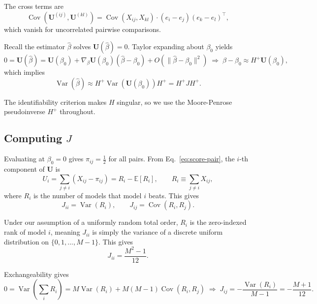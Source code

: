 \documentclass{article}
\DeclareMathOperator{\Var}{Var}
\DeclareMathOperator{\Cov}{Cov}
\begin{document}
The cross terms are 
\begin{equation}
  \Cov\!\left(\mathbf{U}^{(ij)}, \mathbf{U}^{(kl)}\right)
  = \Cov(X_{ij}, X_{kl}) \cdot (e_i - e_j)(e_k - e_l)^\top,
\end{equation}
which vanish for uncorrelated pairwise comparisons.

Recall the estimator $\hat{\beta}$ solves $\mathbf{U}(\hat\beta) = 0$. Taylor expanding about $\beta_0$ yields
\begin{equation}
  0 = \mathbf{U}(\hat\beta)
    = \mathbf{U}(\beta_0) + \nabla_\beta \mathbf{U}(\beta_0)(\hat\beta - \beta_0)
      + O\!\left(\|\hat\beta - \beta_0\|^2\right)
  \;\Longrightarrow\;
  \hat\beta - \beta_0 \approx H^{+}\mathbf{U}(\beta_0),
\end{equation}
which implies
\begin{equation}
  \Var(\hat\beta) \approx H^{+} \Var(\mathbf{U}(\beta_0)) H^{+} = H^{+} J H^{+}.
  \label{eq:sandwich}
\end{equation}

The identifiability criterion makes $H$ singular, so we use the Moore-Penrose pseudoinverse $H^+$ throughout.

\subsection{Computing \texorpdfstring{$J$}{J}}
Evaluating at $\beta_0 = 0$ gives $\pi_{ij} = \frac{1}{2}$ for all pairs. From Eq.~\ref{eq:score-pair}, the $i$-th component of $\mathbf{U}$ is
\begin{equation}
  U_i = \sum_{j \neq i}(X_{ij} - \pi_{ij}) = R_i - \mathbb{E}[R_i],
  \qquad R_i \equiv \sum_{j\neq i} X_{ij},
\end{equation}
where $R_i$ is the number of models that model $i$ beats. This gives 
\begin{equation}
    J_{ii} = \Var(R_i), \qquad J_{ij} = \Cov(R_i, R_j).
\end{equation}

Under our assumption of a uniformly random total order, $R_i$ is the zero-indexed rank of model $i$, meaning $J_{ii}$ is simply the variance of a discrete uniform distribution on $\{0, 1, ..., M-1\}$. This gives
\begin{equation}
    J_{ii} = \frac{M^2 - 1}{12}.
\end{equation}

Exchangeability gives
\begin{equation}
  0 = \Var\!\left(\sum_i R_i\right) = M\Var(R_i) + M(M-1)\Cov(R_i, R_j)
  \;\Longrightarrow\;
  J_{ij} = -\frac{\Var(R_i)}{M-1} = -\frac{M+1}{12}.
\end{equation}
\end{document}
